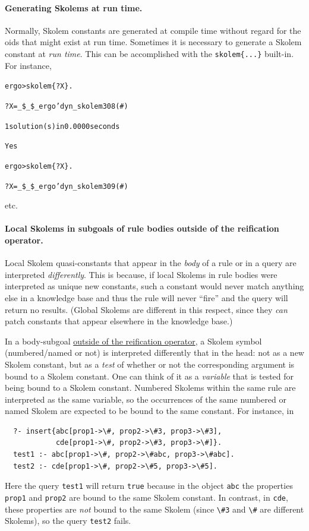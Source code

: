 \documentclass[11pt]{article}
\newcommand{\FLPREFIX}{\_\$\_\$\_ergo}
\newcommand{\prompt}{ergo> }
\newcommand{\bs}{\textbackslash}
\begin{document}
\paragraph{Generating Skolems at run time.}
Normally,
Skolem constants are generated at compile time without regard for the oids
that might exist at run time. Sometimes it is necessary to generate a
Skolem constant at \emph{run time}. This can be accomplished with the
{\tt skolem\{...\}} built-in. For instance, 
\begin{alltt}
\prompt skolem\{?X\}.
 
?X = \FLPREFIX'dyn_skolem308   (\#)
 
1 solution(s) in 0.0000 seconds 
 
Yes

\prompt skolem\{?X\}.

?X = \FLPREFIX'dyn_skolem309  (\#)
\end{alltt}
etc.

\paragraph{Local Skolems in subgoals of rule bodies outside of the reification operator.}
Local Skolem quasi-constants that appear in the \emph{body} of a rule or in
a query are interpreted \emph{differently}. 
This is because, if local Skolems in rule bodies were interpreted as unique
new constants, such a constant would never match anything else in a
knowledge base and thus the rule will never ``fire'' and the query will
return no results. (Global Skolems are different in this respect, since
they \emph{can} patch constants that appear elsewhere in the knowledge
base.) 

In a body-subgoal \underline{outside of the reification operator}, a Skolem
symbol (numbered/named or not) is interpreted differently that in the head: not
as a new  Skolem constant,
but as a \emph{test} of whether or not the
corresponding argument is bound to a Skolem constant. One can think of it
as a \emph{variable} that is tested for being bound to a Skolem constant.
Numbered Skolems within the same rule are interpreted as the same variable,
so the occurrences of the same numbered or named Skolem are expected to be bound to
the same constant. For instance, in
\begin{verbatim}
  ?- insert{abc[prop1->\#, prop2->\#3, prop3->\#3],
            cde[prop1->\#, prop2->\#3, prop3->\#]}.
  test1 :- abc[prop1->\#, prop2->\#abc, prop3->\#abc].
  test2 :- cde[prop1->\#, prop2->\#5, prop3->\#5].
\end{verbatim}
Here the query \texttt{test1} will return \texttt{true} because in the
object \texttt{abc} the properties \texttt{prop1} and \texttt{prop2} are
bound to the same Skolem constant. In contrast, in \texttt{cde}, these
properties are \emph{not} bound to the same Skolem (since \texttt{\bs{}\#3} and
\texttt{\bs{}\#} are different Skolems), so the query \texttt{test2} fails. 
\end{document}
